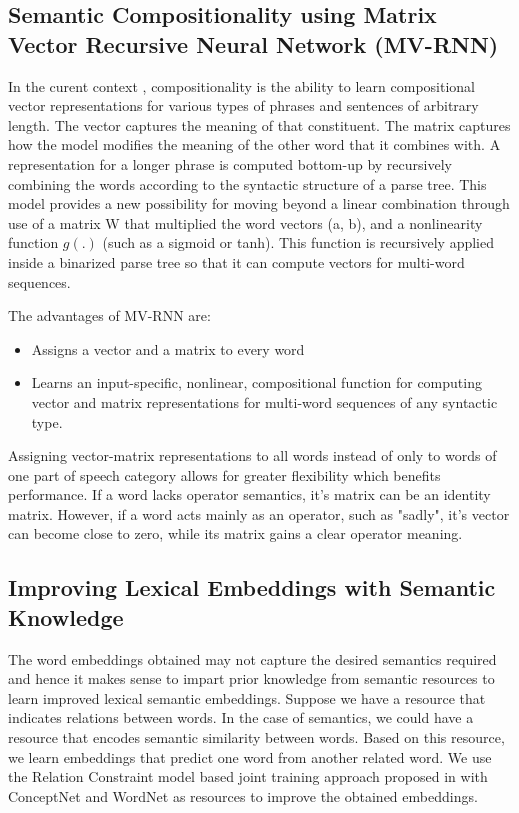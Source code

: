 \documentclass{acm_proc_article-sp}
\begin{document}
\subsection{Semantic Compositionality using Matrix Vector Recursive Neural Network (MV-RNN)}

In the curent context , compositionality is the ability to learn compositional vector representations for various types of phrases and sentences of arbitrary length. The vector captures the meaning of
that constituent. The matrix captures how the model modifies the meaning of the other word that it combines with. A representation for a longer phrase is computed bottom-up by recursively combining the words according to the syntactic structure of a parse tree. This model provides a new possibility for moving beyond a linear combination through use of a matrix W that multiplied the word vectors (a, b), and a nonlinearity function $g(.)$ (such as a sigmoid or tanh). This function is recursively applied inside a binarized parse tree so that it can compute vectors for multi-word sequences.

The advantages of MV-RNN are:
\begin{itemize}
\item Assigns a vector and a matrix to every word
\item Learns an input-specific, nonlinear, compositional function for computing vector and matrix representations for multi-word sequences of any syntactic type. 
\end{itemize}

Assigning vector-matrix representations to all words instead of only to words of one part of speech category allows for greater flexibility which benefits performance. If a word lacks operator semantics, it's matrix can be an identity matrix. However, if a word acts mainly as an operator, such as "sadly", it's vector can become close to zero, while its matrix gains a clear operator meaning.

\subsection{Improving Lexical Embeddings with Semantic Knowledge}

The word embeddings obtained may not capture the desired semantics required and hence it makes sense to impart prior knowledge from semantic resources to learn improved lexical semantic embeddings. Suppose we have a resource that indicates relations between words. In the case of semantics, we could have a resource that encodes semantic similarity between words. Based on this resource, we learn embeddings that predict one word from another related word. We use the Relation Constraint model based joint training approach proposed in \cite{yu2014improving} with ConceptNet and WordNet as resources to improve the obtained embeddings.
\end{document}
